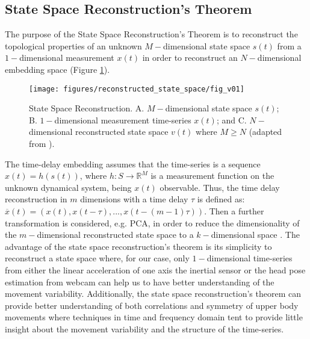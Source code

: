 \documentclass{sigchi}
\begin{document}
\subsection{State Space Reconstruction's Theorem}
The purpose of the State Space Reconstruction's Theorem is to reconstruct the
topological properties of an unknown $M-$dimensional state space $s(t)$ from a
$1-$dimensional measurement $x(t)$ in order to reconstruct an $N-$dimensional
embedding space
(Figure \ref{fig:takens_theorem}).
\begin{figure}
\centering
\texttt{[image: figures/reconstructed\_state\_space/fig\_v01]}
\caption[PA]{State Space Reconstruction. A. $M-$dimensional state space $s(t)$;
B. $1-$dimensional measurement time-series $x(t)$; and
C. $N-$dimensional reconstructed state space $v(t)$
where $M \geq N$ (adapted from \cite{QuintanaDuque2012}).}
\label{fig:takens_theorem}
\end{figure}
The time-delay embedding assumes that the time-series is a sequence $x(t)=h(s(t))$,
where $h: S \rightarrow \mathbb{R}^M$ is a measurement function on the unknown
dynamical system, being $x(t)$ observable.
Thus, the time delay reconstruction in $m$ dimensions with a time delay
$\tau$ is defined as: $\overline{x}(t) = (x(t), x(t-\tau),...,x(t-(m-1)\tau))$.
Then a further transformation is considered, e.g. PCA, in order to reduce
the dimensionality of the $m-$dimensional reconstructed state space
to a $k-$dimensional space \cite{Uzal2011}.
The advantage of the state space reconstruction's theorem is its
simplicity to reconstruct a state space where, for our case, only $1-$dimensional time-series
from either the linear acceleration of one axis the inertial sensor or the head
pose estimation from webcam can help us to have better understanding of the movement
variability. Additionally, the state space reconstruction's theorem can provide better
understanding of both correlations and symmetry of upper body movements where
techniques in time and frequency domain tent to provide little insight about the
movement variability and the structure of the time-series.

\end{document}
